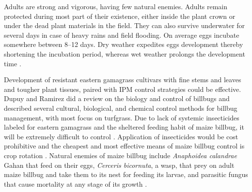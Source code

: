 \documentclass[agronomy,article,submit,moreauthors,pdftex,10pt,a4paper]{mdpi}
\theoremstyle{mdpi}
\newcounter{ex}
\newcounter{re}
\theoremstyle{mdpidefinition}
\begin{document}
Adults are strong and vigorous, having few natural enemies. Adults remain protected during most part of their existence, either inside the plant crown or under the dead plant materials in the field. They can also survive underwater for several days in case of heavy rains and field flooding. On average eggs incubate somewhere between 8–12 days. Dry weather expedites eggs development thereby shortening the incubation period, whereas wet weather prolongs the development time \cite{hayes20}. 

Development of resistant eastern gamagrass cultivars with fine stems and leaves and tougher plant tissues, paired with IPM control strategies could be effective. Dupuy and Ramirez \cite{dupuy16} did a review on the biology and control of billbugs and described several cultural, biological, and chemical control methods for billbug management, with most focus on turfgrass. Due to lack of systemic insecticides labeled for eastern gamagrass and the  sheltered feeding habit of maize billbug, it  will be extremely difficult to control \cite{kuhn12}. Application of insecticides would be cost prohibitive and the cheapest and most effective means of maize billbug control is crop rotation \cite{cwright1929}. Natural enemies of maize billbug include \textit{Anaphoidea calandrae} Gahan that feed on their eggs, \textit{Cerceris bicornuta}, a wasp, that prey on adult maize billbug and take them to its nest for feeding its larvae, and parasitic fungus that cause mortality at any stage of its growth \cite{vaurie}.



\end{document}
